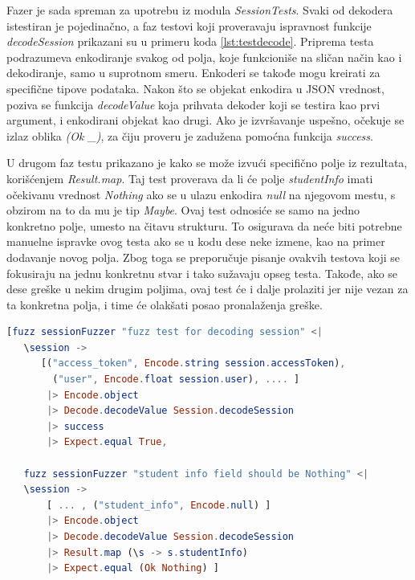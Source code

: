 \documentclass[12pt,oneside]{memoir}
\begin{document}
\par Fazer je sada spreman za upotrebu iz modula \emph{SessionTests}. Svaki od dekodera istestiran je pojedinačno, a faz testovi koji proveravaju ispravnost funkcije \emph{decodeSession} prikazani su u primeru koda \ref{lst:testdecode}. Priprema testa podrazumeva enkodiranje svakog od polja, koje funkcioniše na sličan način kao i dekodiranje, samo u suprotnom smeru. Enkoderi se takođe mogu kreirati za specifične tipove podataka. Nakon što se objekat enkodira u JSON vrednost, poziva se funkcija \emph{decodeValue} koja prihvata dekoder koji se testira kao prvi argument, i enkodirani objekat kao drugi. Ako je izvršavanje uspešno, očekuje se izlaz oblika \emph{(Ok \_)}, za čiju proveru je zadužena pomoćna funkcija \emph{success}. 
\par U drugom faz testu prikazano je kako se može izvući specifično polje iz rezultata, korišćenjem \emph{Result.map}. Taj test proverava da li će polje \emph{studentInfo} imati očekivanu vrednost \emph{Nothing} ako se u ulazu enkodira \emph{null} na njegovom mestu, s obzirom na to da mu je tip \emph{Maybe}. Ovaj test odnosiće se samo na jedno konkretno polje, umesto na čitavu strukturu. To osigurava da neće biti potrebne manuelne ispravke ovog testa ako se u kodu dese neke izmene, kao na primer dodavanje novog polja. Zbog toga se preporučuje pisanje ovakvih testova koji se fokusiraju na jednu konkretnu stvar i tako sužavaju opseg testa. Takođe, ako se dese greške u nekim drugim poljima, ovaj test će i dalje prolaziti jer nije vezan za ta konkretna polja, i time će olakšati posao pronalaženja greške.

\begin{minipage}{\linewidth}
\begin{lstlisting}[language=elm, basicstyle=\small, caption={Implementacija testova za funkciju \emph{decodeSession}},captionpos=b, label={lst:testdecode}]
  [fuzz sessionFuzzer "fuzz test for decoding session" <| 
   \session -> 
      [("access_token", Encode.string session.accessToken),
        ("user", Encode.float session.user), .... ]
       |> Encode.object
       |> Decode.decodeValue Session.decodeSession
       |> success
       |> Expect.equal True, 
         
   fuzz sessionFuzzer "student info field should be Nothing" <| 
   \session -> 
       [ ... , ("student_info", Encode.null) ]
       |> Encode.object
       |> Decode.decodeValue Session.decodeSession
       |> Result.map (\s -> s.studentInfo)
       |> Expect.equal (Ok Nothing) ]
\end{lstlisting}
\end{minipage}
\end{document}
